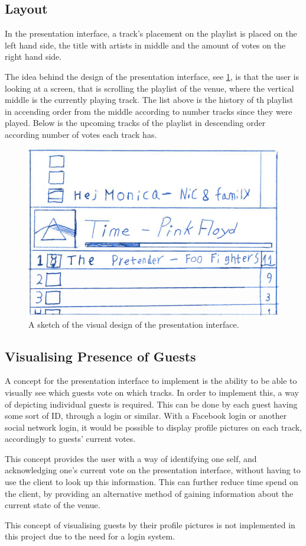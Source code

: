 \subsection{Layout}
In the presentation interface, a track's placement on the playlist is
placed on the left hand side, the title with artists in middle and the
amount of votes on the right hand side.

The idea behind the design of the presentation interface, see \cref{fig:presentation}, is that the user is looking at a screen, that is scrolling the playlist of the venue, where the vertical middle is the currently playing track. The list above is the history of th playlist in accending order from the middle according to number tracks since they were played. Below is the upcoming tracks of the playlist in descending order according number of votes each track has.

\begin{figure}[hbtp]
  \centering
  \includegraphics[width=1.0\linewidth]{Images/presentationInterface.png}
  \caption{A sketch of the visual design of the presentation interface.}\label{fig:presentation}
\end{figure}

\subsection{Visualising Presence of Guests}

A concept for the presentation interface to implement is the ability
to be able to visually see which guests vote on which tracks. In order
to implement this, a way of depicting individual guests is
required. This can be done by each guest having some sort of ID,
through a login or similar. With a Facebook login or another social
network login, it would be possible to display profile pictures
on each track, accordingly to guests' current votes.

This concept
provides the user with a way of identifying one self, and
acknowledging one's current vote on the presentation interface,
without having to use the client to look up this information. This can
further reduce time spend on the client, by providing an alternative
method of gaining information about the current state of the
venue.

This concept of visualising guests by their profile pictures is not
implemented in this project due to the need for a login system.

